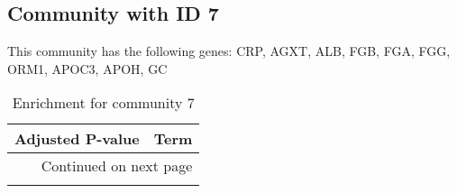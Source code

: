 \subsection*{Community with ID 7}
This community has the following genes: CRP, AGXT, ALB, FGB, FGA, FGG, ORM1, APOC3, APOH, GC
\\
\begin{longtable}{p{2.4cm}p{14.5cm}}
\caption{Enrichment for community 7}\\
\toprule
Adjusted \newline P-value &                                                                                          Term \\
\midrule
\endhead
\midrule
\multicolumn{2}{r}{{Continued on next page}} \\
\midrule
\endfoot


\end{longtable}
